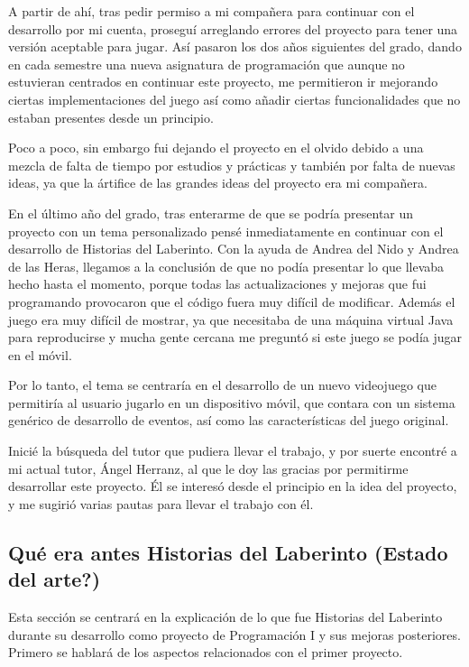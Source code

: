 \documentclass[12pt]{article}
\begin{document}
A partir de ahí, tras pedir permiso a mi compañera para continuar con el desarrollo por mi cuenta, proseguí arreglando errores del proyecto para tener una versión aceptable para jugar.
Así pasaron los dos años siguientes del grado, dando en cada semestre una nueva asignatura de programación que aunque no estuvieran centrados en continuar este proyecto, me permitieron ir mejorando ciertas implementaciones del juego así como añadir ciertas funcionalidades que no estaban presentes desde un principio.

Poco a poco, sin embargo fui dejando el proyecto en el olvido debido a una mezcla de falta de tiempo por estudios y prácticas y también por falta de nuevas ideas, ya que la ártifice de las grandes ideas del proyecto era mi compañera.

En el último año del grado, tras enterarme de que se podría presentar un proyecto con un tema personalizado pensé inmediatamente en continuar con el desarrollo de Historias del Laberinto.
Con la ayuda de Andrea del Nido y Andrea de las Heras, llegamos a la conclusión de que no podía presentar lo que llevaba hecho hasta el momento, porque todas las actualizaciones y mejoras que fui programando provocaron que el código fuera muy difícil de modificar.
Además el juego era muy difícil de mostrar, ya que necesitaba de una máquina virtual Java para reproducirse y mucha gente cercana me preguntó si este juego se podía jugar en el móvil.

Por lo tanto, el tema se centraría en el desarrollo de un nuevo videojuego que permitiría al usuario jugarlo en un dispositivo móvil, que contara con un sistema genérico de desarrollo de eventos, así como las características del juego original.

Inicié la búsqueda del tutor que pudiera llevar el trabajo, y por suerte encontré a mi actual tutor, Ángel Herranz, al que le doy las gracias por permitirme desarrollar este proyecto.
Él se interesó desde el principio en la idea del proyecto, y me sugirió varias pautas para llevar el trabajo con él.

\newpage
\subsection{Qué era antes Historias del Laberinto (Estado del arte?)}
\onehalfspace

Esta sección se centrará en la explicación de lo que fue Historias del Laberinto durante su desarrollo como proyecto de Programación I y sus mejoras posteriores.
Primero se hablará de los aspectos relacionados con el primer proyecto.
\end{document}
